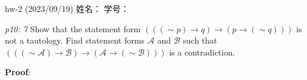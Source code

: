 \documentclass[UTF8,12pt,a4paper]{ctexart}
\newcommand{\negs}{\sim\!}
\begin{document}
	

\begin{center}
hw-2 (2023/09/19) \qquad\qquad 姓名：  \hspace{7em}  学号： 
\end{center}



\emph{p10: 7} \qquad
Show that the statement form $(((\negs p) \to q)  \to (p \to (\negs q)))$ 
is not a tautology. Find statement forms $\mathscr{A}$ and $\mathscr{B}$ such that 
$(((\negs \mathscr{A}) \to \mathscr{B})  \to (\mathscr{A} \to (\negs \mathscr{B})))$ is a contradiction.


\textbf{Proof}:











\end{document}
